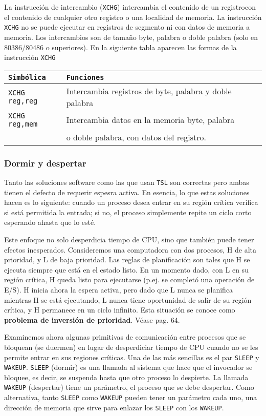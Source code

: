 \documentclass{article}
\begin{document}
\par
\noindent La instrucci\'on de intercambio ({\tt XCHG}) intercambia 
el contenido de un registrocon el contenido de cualquier otro 
registro o una localidad de memoria. La instrucci\'on {\tt XCHG} 
no se puede ejecutar en registros de segmento ni con datos de 
memoria a memoria. Los intercambios son de tama\~no byte, palabra 
o doble palabra (solo en 80386/80486 o superiores). En la siguiente 
tabla aparecen las formas de la instrucci\'on {\tt XCHG}
\begin{center}
\begin{tabular}{|l|l|}\hline
{\tt Simb\'olica}&{\tt Funciones}\\\hline
{\tt XCHG reg,reg}&Intercambia registros de byte, palabra y 
doble palabra\\\hline
{\tt XCHG reg,mem}&Intercambia datos en la memoria byte, palabra \\
&o doble palabra, con datos del registro.\\\hline
\end{tabular}
\end{center}

\subsubsection*{Dormir y despertar}
Tanto las soluciones software como las que usan {\tt TSL} son 
correctas pero ambas tienen el defecto de requerir espesra activa. 
En esencia, lo que estas soluciones hacen es lo siguiente: cuando 
un proceso desea entrar en su regi\'on cr\'itica verifica si est\'a 
permitida la entrada; si no, el proceso simplemente repite un ciclo 
corto esperando ahasta que lo est\'e.

Este enfoque no solo desperdicia tiempo de CPU, sino que tambi\'en 
puede tener efectos inesperados. Consideremos una computadora con 
dos procesos, H de alta prioridad, y L de baja prioridad. Las 
reglas de planificaci\'on son tales que H se ejecuta siempre que 
est\'a en el estado listo. En un momento dado, con L en su regi\'on 
cr\'itica, H queda listo para ejecutarse (p.ej. se complet\'o una 
operaci\'on de E/S). H inicia ahora la espera activa, pero dado que 
L nunca se planifica mientras H se est\'a ejecutando, L nunca tiene 
oportunidad de salir de su regi\'on cr\'itica, y H permanece en un 
ciclo infinito. Esta situaci\'on se conoce como {\bf problema de 
inversi\'on de prioridad}. V\'ease \cite{Tanenbaum} pag. 64.

Examinemos ahora algunas primitivas de comunicaci\'on entre procesos 
que se bloquean (se duermen) en lugar de desperdiciar tiempo de CPU 
cuando no se les permite entrar en sus regiones cr\'iticas. Una de las 
m\'as sencillas es el par {\tt SLEEP} y {\tt WAKEUP}. {\tt SLEEP} 
(dormir) es una llamada al sistema que hace que el invocador se 
bloquee, es decir, se suspenda hasta que otro proceso lo despierte. 
La llamada {\tt WAKEUP} (despertar) tiene un par\'ametro, el proceso 
que se debe despertar. Como alternativa, tanto {\tt SLEEP} como 
{\tt WAKEUP} pueden tener un par\'ametro cada uno, una direcci\'on de 
memoria que sirve para enlazar los {\tt SLEEP} con los {\tt WAKEUP}.
\end{document}
